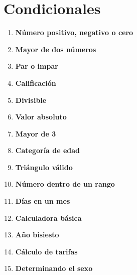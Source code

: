 \section{Condicionales}
\begin{enumerate}
    \item \textbf{Número positivo, negativo o cero}\\
    

    \item \textbf{Mayor de dos números}\\
    

    \item \textbf{Par o impar}\\
    

    \item \textbf{Calificación}\\
    
    
    \item \textbf{Divisible}\\
    

    \item \textbf{Valor absoluto}\\
    

    \item \textbf{Mayor de 3}\\
    

    \item \textbf{Categoría de edad}\\
    

    \item \textbf{Triángulo válido}\\
    
    
    \item \textbf{Número dentro de un rango}\\
    

    \item \textbf{Días en un mes}\\
    

    \item \textbf{Calculadora básica}\\
    

    \item \textbf{Año bisiesto}\\
    

    \item \textbf{Cálculo de tarifas}\\
    
    
    \item \textbf{Determinando el sexo}\\
    
\end{enumerate}

